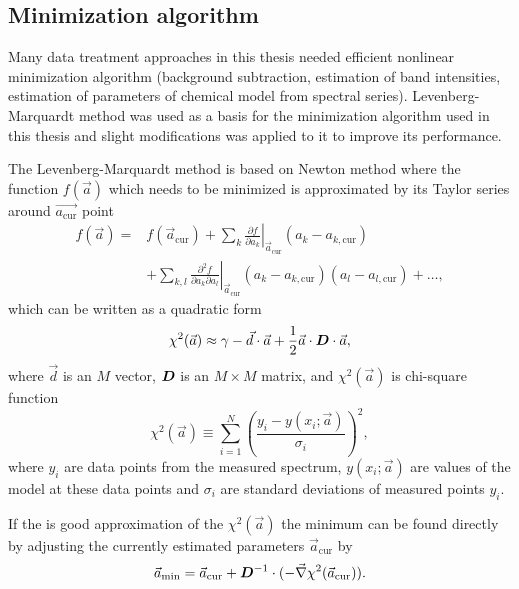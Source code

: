 \subsection{Minimization algorithm}
\label{minimization}

Many data treatment approaches in this thesis needed efficient nonlinear
minimization algorithm (background subtraction, estimation of band intensities,
estimation of parameters of chemical model from spectral series).
Levenberg-Marquardt method
\parencite{Marquardt1963}
was used as a basis for the minimization algorithm used in this thesis and
slight modifications was applied to it to improve its performance.

The Levenberg-Marquardt method is based on Newton method where
the function $f(\vec{a})$ which needs to be minimized is approximated by its
Taylor series around $\vec{a_\text{cur}}$ point
\begin{align*}
	f(\vec{a}) =& f(\vec{a}_\text{cur})
		+ \sum_k \left.\frac{\partial{}f}{\partial{}a_k}\right
			\rvert_{\vec{a}_\text{cur}}(a_k - a_{k,\text{cur}})\\
		&+ \sum_{k,l} \left.\frac{
			\partial^2f
		}{
			\partial{}a_k\partial{}a_l
		}\right\rvert_{\vec{a}_\text{cur}}
		(a_k - a_{k,\text{cur}})(a_l - a_{l,\text{cur}})
		+ \dots,
\end{align*}
which can be written as a quadratic form
\begin{equation}
	\chi^2(\vec{a}) \approx
		\gamma
		- \vec{d}\cdot\vec{a}
		+ \frac{1}{2}\vec{a}\cdot{}\mat{D}\cdot\vec{a},
	\label{\eqnlabel{minimization:chi_approx}}
\end{equation}
where $\vec{d}$ is an $M$ vector, $\bm{D}$ is an $M\times{}M$ matrix, and
$\chi^2(\vec{a})$ is chi-square function
\begin{equation*}
	\chi^2(\vec{a}) \equiv \sum_{i=1}^N\left(
			\frac{y_i - y(x_i;\vec{a})}{\sigma_i}
	\right)^2,
\end{equation*}
where $y_i$ are data points from the measured spectrum,
$y(x_i;\vec{a})$ are values of the model at these data points and
$\sigma_i$ are standard deviations of measured points $y_i$.

If the
is good approximation of the $\chi^2(\vec{a})$ the minimum can be found
directly by adjusting the currently estimated parameters $\vec{a}_\text{cur}$
by
\begin{equation}
	\vec{a}_\text{min} = \vec{a}_\text{cur}
		+ \mat{D}^{-1}\cdot(-\vec{\nabla}\chi^2(\vec{a}_\text{cur})).
	\label{\eqnlabel{minimization:newton_min}}
\end{equation}

